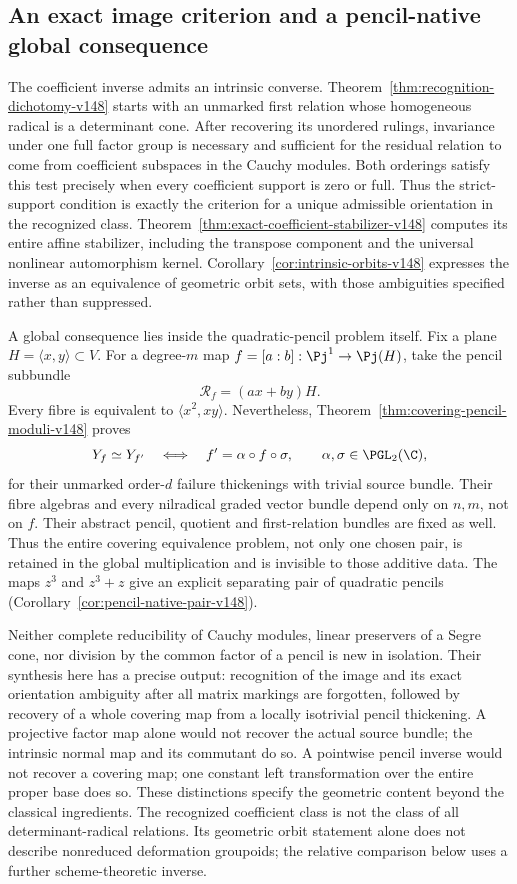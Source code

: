 \subsection{An exact image criterion and a pencil-native global consequence}
The coefficient inverse admits an intrinsic converse.
Theorem~\ref{thm:recognition-dichotomy-v148} starts with an
unmarked first relation whose homogeneous radical is a determinant
cone.  After recovering its unordered rulings, invariance under one
full factor group is necessary and sufficient for the residual
relation to come from coefficient subspaces in the Cauchy modules.
Both orderings satisfy this test precisely when every coefficient
support is zero or full.  Thus the strict-support condition is
exactly the criterion for a unique admissible orientation in the
recognized class.  Theorem~\ref{thm:exact-coefficient-stabilizer-v148}
computes its entire affine stabilizer, including the transpose
component and the universal nonlinear automorphism kernel.
Corollary~\ref{cor:intrinsic-orbits-v148} expresses the inverse as
an equivalence of geometric orbit sets, with those ambiguities
specified rather than suppressed.

A global consequence lies inside the quadratic-pencil problem
itself.  Fix a plane \(H=\langle x,y\rangle\subset V\).
For a degree-\(m\) map \(f=[a:b]:\Pj^1\to\Pj(H)\), take
the pencil subbundle
\[
                  \mathcal R_f=(ax+by)H.
\]
Every fibre is equivalent to \(\langle x^2,xy\rangle\).
Nevertheless, Theorem~\ref{thm:covering-pencil-moduli-v148} proves
\[
 Y_f\simeq Y_{f'}\quad\Longleftrightarrow\quad
 f'=\alpha\circ f\circ\sigma,\qquad
                         \alpha,\sigma\in\PGL_2(\C),
\]
for their unmarked order-\(d\) failure thickenings with trivial
source bundle.  Their fibre algebras and every nilradical graded
vector bundle depend only on \(n,m\), not on \(f\).
Their abstract pencil, quotient and first-relation bundles are
fixed as well.  Thus the entire covering equivalence problem, not
only one chosen pair, is retained in the global multiplication and
is invisible to those additive data.  The maps \(z^3\) and
\(z^3+z\) give an explicit separating pair of quadratic pencils
(Corollary~\ref{cor:pencil-native-pair-v148}).

Neither complete reducibility of Cauchy modules, linear preservers
of a Segre cone, nor division by the common factor of a pencil is
new in isolation.  Their synthesis here has a precise output:
recognition of the image and its exact orientation ambiguity after
all matrix markings are forgotten, followed by recovery of a
whole covering map from a locally isotrivial pencil thickening.
A projective factor map alone would not recover the actual source
bundle; the intrinsic normal map and its commutant do so.  A
pointwise pencil inverse would not recover a covering map; one
constant left transformation over the entire proper base does so.
These distinctions specify the geometric content beyond the
classical ingredients.  The recognized coefficient class is not the
class of all determinant-radical relations.  Its geometric orbit
statement alone does not describe nonreduced deformation groupoids;
the relative comparison below uses a further scheme-theoretic inverse.


